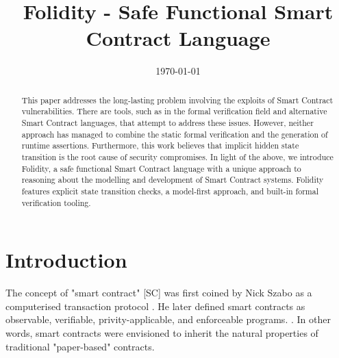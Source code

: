 \documentclass[oneside]{ecsproject}     %
\begin{document}
\frontmatter
\title      {Folidity - Safe Functional Smart Contract Language}
\addresses  {\groupname\\\deptname\\\univname}
\date       {\today}
\subject    {}
\keywords   {}
\maketitle

\begin{abstract}
  This paper addresses the long-lasting problem involving the exploits of Smart Contract vulnerabilities.
  There are tools, such as in the formal verification field and alternative Smart Contract languages, that
  attempt to address these issues. However, neither approach has managed to combine
  the static formal verification and the generation of runtime assertions. 
  Furthermore, this work believes that implicit hidden state transition is the root cause
  of security compromises. In light of the above, we introduce Folidity, a safe functional Smart Contract language
  with a unique approach to reasoning about the modelling and development of Smart Contract systems.
  Folidity features explicit state transition checks, a model-first approach, and built-in formal verification
  tooling.
\end{abstract}

\tableofcontents
\mainmatter


\chapter{Introduction}

The concept of "smart contract" [SC] was first coined by Nick Szabo as a computerised transaction protocol \cite{nz_sc}.
He later defined smart contracts as observable, verifiable, privity-applicable, and enforceable programs. \cite{nz_sc_bb}.
In other words, smart contracts were envisioned to inherit the natural properties of traditional "paper-based" contracts.
\end{document}

